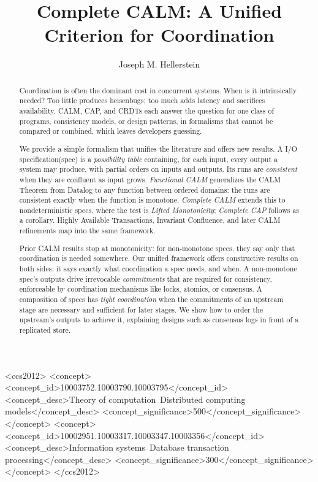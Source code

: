 \documentclass[sigconf]{cidr-2027}
\theoremstyle{remark}
\newcommand{\commitments}{commitments\xspace}
\newcommand{\spectype}[1][]{I/O specification#1\xspace}
\begin{document}
\title{Complete CALM: A Unified Criterion for Coordination}

\author{Joseph M. Hellerstein}

\begin{abstract}
Coordination is often the dominant cost in concurrent systems. When is it
intrinsically needed? Too little
produces heisenbugs; too much adds latency and sacrifices
availability.  CALM, CAP, and CRDTs each answer the question for one class of
programs, consistency models, or design patterns, in formalisms that cannot be
compared or combined, which leaves developers guessing.

We provide a simple formalism that unifies the literature and
offers new results.  A \spectype (spec) is a \emph{possibility table} containing, for
each input, every output a system may produce, with partial orders on inputs and
outputs.  Its runs are \emph{consistent} when they are confluent as input grows.
\emph{Functional CALM} generalizes the CALM Theorem from Datalog to any function
between ordered domains: the runs are consistent exactly when the function is
monotone.  \emph{Complete CALM}
extends this to nondeterministic specs, where the test is
\emph{Lifted Monotonicity}; \emph{Complete CAP} follows as a corollary.
Highly Available Transactions, Invariant Confluence, and later CALM refinements
map into the same framework.

Prior CALM results stop at monotonicity: for non-monotone
specs, they say only that coordination is needed somewhere.  Our
unified framework offers constructive results on both sides: it says exactly
what coordination a spec needs, and when.  A non-monotone
spec's outputs drive irrevocable \emph{\commitments} that are required for consistency,
enforceable by coordination mechanisms like locks, atomics, or consensus.
A composition of specs has \emph{tight coordination} when the \commitments of an upstream stage
are necessary and sufficient for later stages.
We show how to order the upstream's outputs to achieve it, explaining designs such
as consensus logs in front of a replicated store.
\end{abstract}

\begin{CCSXML}
<ccs2012>
<concept>
<concept_id>10003752.10003790.10003795</concept_id>
<concept_desc>Theory of computation~Distributed computing models</concept_desc>
<concept_significance>500</concept_significance>
</concept>
<concept>
<concept_id>10002951.10003317.10003347.10003356</concept_id>
<concept_desc>Information systems~Database transaction processing</concept_desc>
<concept_significance>300</concept_significance>
</concept>
</ccs2012>
\end{CCSXML}
\end{document}
